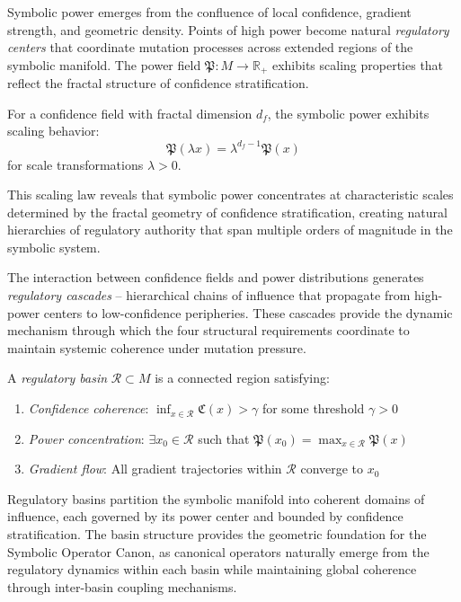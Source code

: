Symbolic power emerges from the confluence of local confidence, gradient strength, and geometric density. Points of high power become natural \emph{regulatory centers} that coordinate mutation processes across extended regions of the symbolic manifold. The power field $\mathfrak{P}: M \to \mathbb{R}_+$ exhibits scaling properties that reflect the fractal structure of confidence stratification.

\begin{lemma}
\label{lemma:bk6_power_scaling}
For a confidence field with fractal dimension $d_f$, the symbolic power exhibits scaling behavior:
\begin{equation}
\mathfrak{P}(\lambda x) = \lambda^{d_f - 1} \mathfrak{P}(x)
\end{equation}
for scale transformations $\lambda > 0$.
\end{lemma}

This scaling law reveals that symbolic power concentrates at characteristic scales determined by the fractal geometry of confidence stratification, creating natural hierarchies of regulatory authority that span multiple orders of magnitude in the symbolic system.

The interaction between confidence fields and power distributions generates \emph{regulatory cascades} -- hierarchical chains of influence that propagate from high-power centers to low-confidence peripheries. These cascades provide the dynamic mechanism through which the four structural requirements coordinate to maintain systemic coherence under mutation pressure.

\begin{definition}
\label{definition:bk6_regulatory_basin}
A \emph{regulatory basin} $\mathcal{R} \subset M$ is a connected region satisfying:
\begin{enumerate}
\item \emph{Confidence coherence}: $\inf_{x \in \mathcal{R}} \mathfrak{C}(x) > \gamma$ for some threshold $\gamma > 0$
\item \emph{Power concentration}: $\exists x_0 \in \mathcal{R}$ such that $\mathfrak{P}(x_0) = \max_{x \in \mathcal{R}} \mathfrak{P}(x)$
\item \emph{Gradient flow}: All gradient trajectories within $\mathcal{R}$ converge to $x_0$
\end{enumerate}
\end{definition}

Regulatory basins partition the symbolic manifold into coherent domains of influence, each governed by its power center and bounded by confidence stratification. The basin structure provides the geometric foundation for the Symbolic Operator Canon, as canonical operators naturally emerge from the regulatory dynamics within each basin while maintaining global coherence through inter-basin coupling mechanisms.

